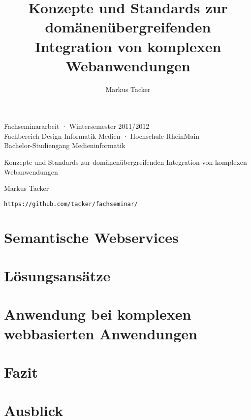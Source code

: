 \documentclass[10pt,a4paper]{article}
\begin{document}
\author{Markus Tacker}
\title{Konzepte und Standards zur domänenübergreifenden Integration von komplexen Webanwendungen}

\begin{center}

\begin{small}Fachseminararbeit · Wintersemester 2011/2012\\Fachbereich Design Informatik Medien · Hochschule RheinMain\\Bachelor-Studiengang Medieninformatik\end{small}

\bigskip

\begin{huge}Konzepte und Standards 
\medskip
zur domänenübergreifenden Integration
\medskip
von komplexen Webanwendungen\end{huge}

\bigskip

\begin{large}Markus Tacker\end{large}

\begin{small}\texttt{https://github.com/tacker/fachseminar/}\end{small}

\end{center}



\pagebreak

\tableofcontents



\section{Semantische Webservices}
\label{l:sem-web-ser}


\section{Lösungsansätze}
\label{l:loesungen}
% 

\section{Anwendung bei komplexen webbasierten Anwendungen}
\label{l:verwendung}
% 

\section{Fazit}
\label{l:fazit}
% 

\section{Ausblick}
\label{l:ausblick}
% 

\pagebreak




\end{document}

